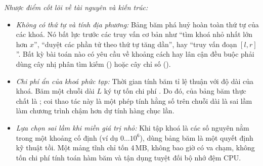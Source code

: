 \documentclass[../../algorithm.tex]{subfiles}
\begin{document}
\emph{Nhược điểm cốt lõi về tài nguyên và kiến trúc:}
\begin{itemize}
\item \emph{Không có thứ tự và tính địa phương:} Bảng băm phá huỷ hoàn toàn thứ tự của các khoá. Nó bất lực trước các truy vấn cơ bản như ``tìm khoá nhỏ nhất lớn hơn \(x\)'', ``duyệt các phần tử theo thứ tự tăng dần'', hay ``truy vấn đoạn \([l, r]\)''. Bất kỳ bài toán nào có yêu cầu về khoảng cách hay lân cận đều buộc phải dùng cây nhị phân tìm kiếm () hoặc cây chỉ số ().
\item \emph{Chi phí ẩn của khoá phức tạp:} Thời gian tính băm tỉ lệ thuận với độ dài của khoá. Băm một chuỗi dài \(L\) ký tự tốn chi phí . Do đó,  của bảng băm thực chất là ; coi thao tác này là một phép tính hằng số trên chuỗi dài là sai lầm làm chương trình chậm hơn dự tính hàng chục lần.
\item \emph{Lựa chọn sai lầm khi miền giá trị nhỏ:} Khi tập khoá là các số nguyên nằm trong một khoảng cố định (ví dụ \(0 \dots 10^6\)), dùng bảng băm là một quyết định kỹ thuật tồi. Một mảng tĩnh  chỉ tốn 4\,MB, không bao giờ có va chạm, không tốn chi phí tính toán hàm băm và tận dụng tuyệt đối bộ nhớ đệm CPU.
\end{itemize}
\end{document}
